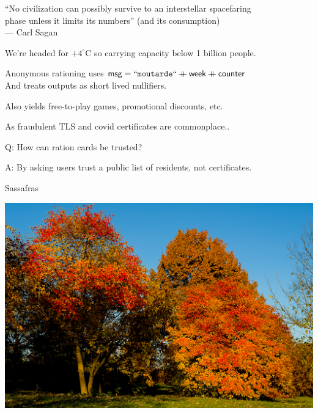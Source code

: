 \documentclass{beamer}
\begin{document}
\begin{frame}

``No civilization can possibly survive to an interstellar spacefaring \\ \smallskip
\hspace{1pt} phase unless it limits its numbers'' (and its consumption) \\ \medskip
\hspace{1pt} --- Carl Sagan

\bigskip\bigskip 

We're headed for $+4^{\circ}$C so carrying capacity below 1 billion people.

\pause\bigskip\bigskip 

Anonymous rationing uses $\mathsf{msg} = \mathtt{``moutarde``} \mathbin{+\mkern-10mu+} \mathsf{week} \mathbin{+\mkern-10mu+} \mathsf{counter}$ \\
\hspace{1pt} And treats outputs as short lived nullifiers.

\bigskip\bigskip 

Also yields free-to-play games, promotional discounts, etc.

\end{frame}



\begin{frame}

As fraudulent TLS and covid certificates are commonplace..

\bigskip

Q: How can ration cards be trusted?

\bigskip 

A: By asking users trust a public list of residents, not certificates.


\end{frame}



\begin{frame}{Sassafras}

\includegraphics[width=\textwidth]{Sassafras-albidum.jpg}

\end{frame}
\end{document}
